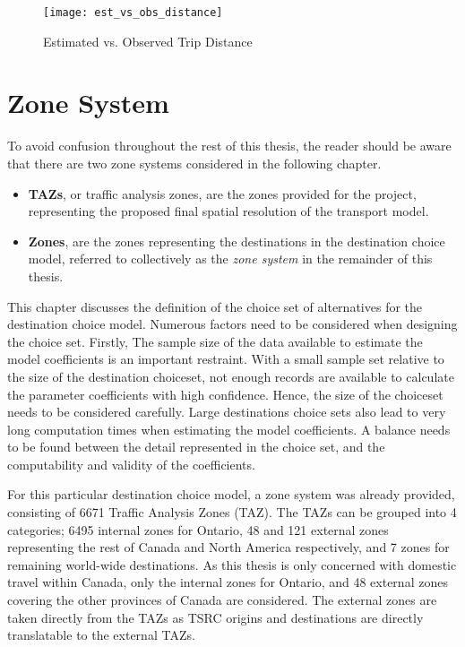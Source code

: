 \begin{figure}[H]
\centering
\texttt{[image: est\_vs\_obs\_distance]}
\caption{Estimated vs. Observed Trip Distance}
\label{fig:distance}
\end{figure}

\section{Zone System}
To avoid confusion throughout the rest of this thesis, the reader should be aware that there are two zone systems considered in the following chapter.
\begin{itemize}
\item \textbf{TAZs}, or traffic analysis zones, are the zones provided for the project, representing the proposed final spatial resolution of the transport model.
\item \textbf{Zones}, are the zones representing the destinations in the destination choice model, referred to collectively as the \textit{zone system} in the remainder of this thesis.  
\end{itemize}

This chapter discusses the definition of the choice set of alternatives for the destination choice model. Numerous factors need to be considered when designing the choice set. Firstly, The sample size of the data available to estimate the model coefficients is an important restraint. With a small sample set relative to the size of the destination choiceset, not enough records are available to calculate the parameter coefficients with high confidence. Hence, the size of the choiceset needs to be considered carefully. Large destinations choice sets also lead to very long computation times when estimating the model coefficients. A balance needs to be found between the detail represented in the choice set, and the computability and validity of the coefficients.

For this particular destination choice model, a zone system was already provided, consisting of 6671 Traffic Analysis Zones (TAZ). The TAZs can be grouped into 4 categories; 6495 internal zones for Ontario, 48 and 121 external zones representing the rest of Canada and North America respectively, and 7 zones for remaining world-wide destinations. As this thesis is only concerned with domestic travel within Canada, only the internal zones for Ontario, and 48 external zones covering the other provinces of Canada are considered. The external zones are taken directly from the TAZs as TSRC origins and destinations are directly translatable to the external TAZs.

